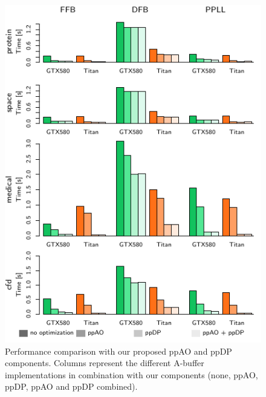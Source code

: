 \documentclass{egpubl}
\newcommand{\todo}[1]{{\color{red}\emph{(#1)}}}
\newcommand{\ab}{\mbox{A-buffer}}
\newcommand{\stencil}{ppAO}
\newcommand{\dloop}{ppDP}
\begin{document}
\begin{figure}[t]
  \centering
    \includegraphics{figures/plot-performance-gtx580} %
    \caption{\label{fig:performance}%
      Performance comparison with our proposed \stencil{} and \dloop{} components.
      Columns represent the different \ab{} implementations in combination with our components (none, \stencil{}, \dloop{}, \stencil{} and \dloop{} combined).
    }
\end{figure}





\end{document}
